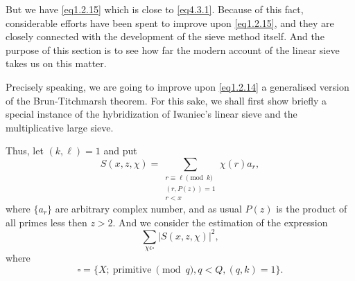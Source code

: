 But we have \eqref{eq1.2.15} which is close to
\eqref{eq4.3.1}. Because of this fact, 
considerable efforts have been spent to improve upon \eqref{eq1.2.15}, and
they are closely connected with the development of the\pageoriginale
sieve method 
itself. And the purpose of this section is to see how far the modern
account of the linear sieve takes us on this matter. 

Precisely speaking, we are going to improve upon \eqref{eq1.2.14} a
generalised version of the Brun-Titchmarsh theorem. For this sake, we
shall first show briefly a special instance of the hybridization of
Iwaniec's linear sieve and the multiplicative large sieve.  

Thus, let $(k,\ell) = 1$ and put
$$
S(x,z, \chi) = \sum_{\substack{ r \equiv \ell \pmod{k} \\ (r,P(z)) = 1
    \\ r < x}} \chi(r)a_r, 
$$
where $\{a_r\}$ are arbitrary complex number, and as usual $P(z)$ is
the product of all primes less then $ z > 2$. And we consider the
estimation of the expression 
$$
\sum_{\chi  \epsilon  \square } |S(x,z, \chi)|^2,
$$
where
$$
\square  = \{ X;  ~\text{primitive}~ \pmod{q}, q < Q, (q,k) = 1\}.
$$

